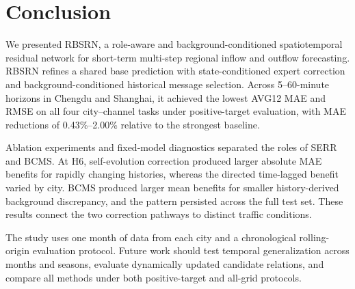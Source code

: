 
\begingroup
\conclusionrevisionstyle
\section{Conclusion}\label{sec:conclusion}

We presented RBSRN, a role-aware and background-conditioned spatiotemporal residual network for short-term multi-step regional inflow and outflow forecasting. RBSRN refines a shared base prediction with state-conditioned expert correction and background-conditioned historical message selection. Across 5--60-minute horizons in Chengdu and Shanghai, it achieved the lowest AVG12 MAE and RMSE on all four city--channel tasks under positive-target evaluation, with MAE reductions of 0.43\%--2.00\% relative to the strongest baseline.

Ablation experiments and fixed-model diagnostics separated the roles of SERR and BCMS. At H6, self-evolution correction produced larger absolute MAE benefits for rapidly changing histories, whereas the directed time-lagged benefit varied by city. BCMS produced larger mean benefits for smaller history-derived background discrepancy, and the pattern persisted across the full test set. These results connect the two correction pathways to distinct traffic conditions.

The study uses one month of data from each city and a chronological rolling-origin evaluation protocol. Future work should test temporal generalization across months and seasons, evaluate dynamically updated candidate relations, and compare all methods under both positive-target and all-grid protocols.
\endgroup
